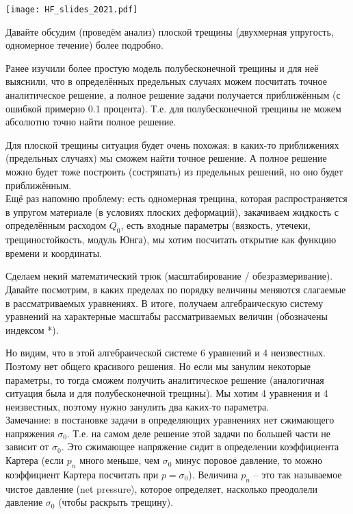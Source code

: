 \documentclass[main.tex]{subfiles}
\begin{document}
\texttt{[image: HF\_slides\_2021.pdf]}

Давайте обсудим (проведём анализ) плоской трещины (двухмерная упругость, одномерное течение) более подробно.

Ранее изучили более простую модель полубесконечной трещины и для неё выяснили, что в определённых предельных случаях можем посчитать точное аналитическое решение, а полное решение задачи получается приближённым (с ошибкой примерно 0.1 процента).
Т.е. для полубесконечной трещины не можем абсолютно точно найти полное решение.

Для плоской трещины ситуация будет очень похожая: в каких-то приближениях (предельных случаях) мы сможем найти точное решение.
А полное решение можно будет тоже построить (состряпать) из предельных решений, но оно будет приближённым.
\\

Ещё раз напомню проблему: есть одномерная трещина, которая распространяется в упругом материале (в условиях плоских деформаций), закачиваем жидкость с определённым расходом $Q_0$, есть входные параметры (вязкость, утечеки, трещиностойкость, модуль Юнга), мы хотим посчитать открытие как функцию времени и координаты.

Сделаем некий математический трюк (масштабирование / обезразмеривание).
Давайте посмотрим, в каких пределах по порядку величины меняются слагаемые в рассматриваемых уравнениях.
В итоге, получаем алгебраическую систему уравнений на характерные масштабы рассматриваемых величин (обозначены индексом *).

Но видим, что в этой алгебраической системе 6 уравнений и 4 неизвестных.
Поэтому нет общего красивого решения.
Но если мы занулим некоторые параметры, то тогда сможем получить аналитическое решение (аналогичная ситуация была и для полубесконечной трещины).
Мы хотим 4 уравнения и 4 неизвестных, поэтому нужно занулить два каких-то параметра.
\\

Замечание: в постановке задачи в определяющих уравнениях нет сжимающего напряжения $\sigma_0$.
Т.е. на самом деле решение этой задачи по большей части не зависит от $\sigma_0$.
Это сжимающее напряжение сидит в определении коэффициента Картера (если $p_n$ много меньше, чем $\sigma_0$ минус поровое давление, то можно коэффициент Картера посчитать при $p=\sigma_0$).
Величина $p_n$ -- это так называемое чистое давление (net pressure), которое определяет, насколько преодолели давление $\sigma_0$ (чтобы раскрыть трещину).
\end{document}
